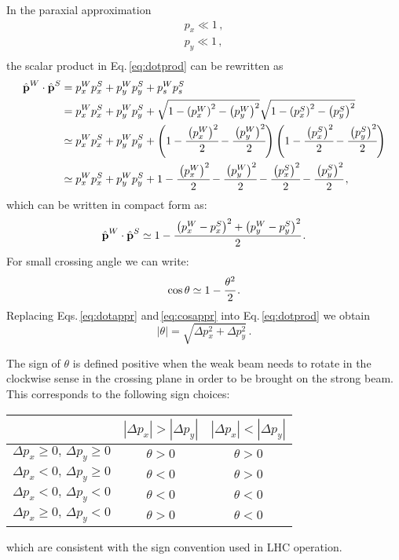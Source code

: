 In the paraxial approximation
\begin{align}
    p_x \ll 1 \, ,\\
    p_y \ll 1 \, ,\\
\end{align}
the scalar product in Eq.\,\eqref{eq:dotprod} can be rewritten as
\begin{align}
    \hat{\textbf{p}}^W\cdot
\hat{\textbf{p}}^S &=
p^W_{x}p^S_{x}+p^W_{y}p^S_{y}+p^W_{s}p^S_{s}
\nonumber\\
&= p^W_{x}p^S_{x}+p^W_{y}p^S_{y} +\sqrt{1 - \left(p^W_{x}\right)^2 - \left(p^W_{y}\right)^2}
\sqrt{1 - \left(p^S_{x}\right)^2 - \left(p^S_{y}\right)^2}
\nonumber\\
&\simeq  p^W_{x}p^S_{x}+p^W_{y}p^S_{y}
+\left(1 - \cfrac{\left(p^W_{x}\right)^2}{2} - \cfrac{\left(p^W_{y}\right)^2}{2}\right)
\left(1 - \cfrac{\left(p^S_{x}\right)^2}{2} - \cfrac{\left(p^S_{y}\right)^2}{2}\right)
\nonumber\\
&\simeq p^W_{x}p^S_{x}+p^W_{y}p^S_{y}
+ 1 - \cfrac{\left(p^W_{x}\right)^2}{2} - \cfrac{\left(p^W_{y}\right)^2}{2} - \cfrac{\left(p^S_{x}\right)^2}{2} - \cfrac{\left(p^S_{y}\right)^2}{2}
\, ,
\end{align}
which can be written in compact form as:
\begin{equation}
\hat{\textbf{p}}^W\cdot
\hat{\textbf{p}}^S
\simeq
1 - \cfrac{
\left(p^W_{x} - p^S_{x}\right)^2 + 
\left(p^W_{y} - p^S_{y}\right)^2}{2}
\, .
\label{eq:dotappr}
\end{equation}
For small crossing angle we can write:
\begin{equation}
    \cos \theta \simeq 1-\cfrac{\theta^2}{2} \, .
    \label{eq:cosappr}
\end{equation}
Replacing Eqs.\,\eqref{eq:dotappr} and\,\eqref{eq:cosappr} into Eq.\,\eqref{eq:dotprod} we obtain
\begin{equation}
    \left| \theta \right| = 
    \sqrt{\Delta p_x^2 + \Delta p_y^2} \, .
\end{equation}

The sign of $\theta$ is defined positive when the weak beam needs to rotate in the clockwise sense in the crossing plane in order to be brought on the strong beam. This corresponds to the following sign choices:
\begin{center}
  \begin{tabular}{c|cc}
     &  $\left|\Delta p_x\right| > \left|\Delta p_y\right|$ & $\left|\Delta p_x\right| < \left|\Delta p_y\right|$\\
     \hline
 $\Delta p_x\geq0,\,   \Delta p_y \geq 0$  &$\theta>0$ &$\theta>0$\\
 $\Delta p_x < 0,\,   \Delta p_y \geq 0$  &$\theta<0$ &$\theta>0$\\
 $\Delta p_x < 0,\,   \Delta p_y < 0$  &$\theta<0$ &$\theta<0$\\
 $\Delta p_x\geq0,\,   \Delta p_y < 0$  &$\theta>0$ &$\theta<0$\\
\end{tabular}  
\end{center}
which are consistent with the sign convention used in LHC operation.

